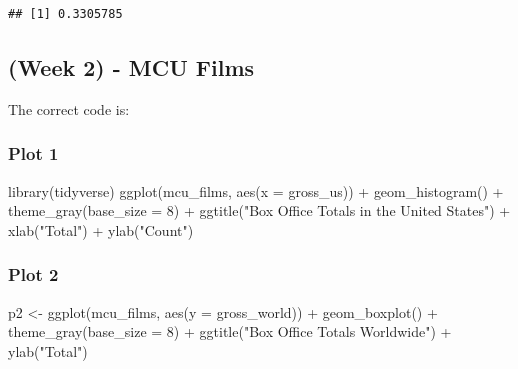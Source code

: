 \documentclass[
]{article}
\newenvironment{Shaded}{\begin{snugshade}}{\end{snugshade}}
\newcommand{\AttributeTok}[1]{\textcolor[rgb]{0.77,0.63,0.00}{#1}}
\newcommand{\DecValTok}[1]{\textcolor[rgb]{0.00,0.00,0.81}{#1}}
\newcommand{\FunctionTok}[1]{\textcolor[rgb]{0.00,0.00,0.00}{#1}}
\newcommand{\NormalTok}[1]{#1}
\newcommand{\OtherTok}[1]{\textcolor[rgb]{0.56,0.35,0.01}{#1}}
\newcommand{\SpecialCharTok}[1]{\textcolor[rgb]{0.00,0.00,0.00}{#1}}
\newcommand{\StringTok}[1]{\textcolor[rgb]{0.31,0.60,0.02}{#1}}
\begin{document}
\begin{verbatim}
## [1] 0.3305785
\end{verbatim}

\hypertarget{week-2---mcu-films}{%
\subsection{(Week 2) - MCU Films}\label{week-2---mcu-films}}

The correct code is:

\hypertarget{plot-1}{%
\subsubsection{Plot 1}\label{plot-1}}

\begin{Shaded}
\begin{Highlighting}[]
\FunctionTok{library}\NormalTok{(tidyverse)}
\FunctionTok{ggplot}\NormalTok{(mcu\_films, }\FunctionTok{aes}\NormalTok{(}\AttributeTok{x =}\NormalTok{ gross\_us)) }\SpecialCharTok{+}
    \FunctionTok{geom\_histogram}\NormalTok{() }\SpecialCharTok{+}
      \FunctionTok{theme\_gray}\NormalTok{(}\AttributeTok{base\_size =} \DecValTok{8}\NormalTok{) }\SpecialCharTok{+}
  \FunctionTok{ggtitle}\NormalTok{(}\StringTok{"Box Office Totals in the United States"}\NormalTok{) }\SpecialCharTok{+}
  \FunctionTok{xlab}\NormalTok{(}\StringTok{"Total"}\NormalTok{) }\SpecialCharTok{+} \FunctionTok{ylab}\NormalTok{(}\StringTok{"Count"}\NormalTok{)}
\end{Highlighting}
\end{Shaded}

\hypertarget{plot-2}{%
\subsubsection{Plot 2}\label{plot-2}}

\begin{Shaded}
\begin{Highlighting}[]
\NormalTok{p2 }\OtherTok{\textless{}{-}} \FunctionTok{ggplot}\NormalTok{(mcu\_films, }\FunctionTok{aes}\NormalTok{(}\AttributeTok{y =}\NormalTok{ gross\_world)) }\SpecialCharTok{+}
    \FunctionTok{geom\_boxplot}\NormalTok{() }\SpecialCharTok{+}
      \FunctionTok{theme\_gray}\NormalTok{(}\AttributeTok{base\_size =} \DecValTok{8}\NormalTok{) }\SpecialCharTok{+}
  \FunctionTok{ggtitle}\NormalTok{(}\StringTok{"Box Office Totals Worldwide"}\NormalTok{) }\SpecialCharTok{+}
  \FunctionTok{ylab}\NormalTok{(}\StringTok{"Total"}\NormalTok{)}
\end{Highlighting}
\end{Shaded}
\end{document}

